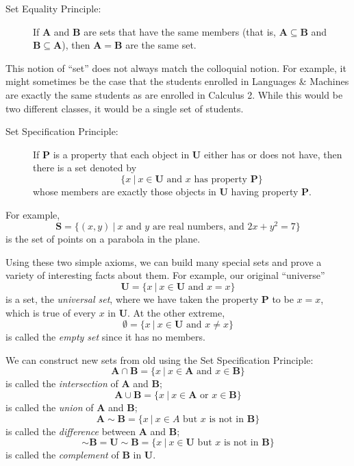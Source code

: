 \documentclass{article}
\newcommand{\Pb}{\mathbf P}
\newcommand{\Sb}{\mathbf S}
\newcommand{\A}{\mathbf A}
\newcommand{\B}{\mathbf B}
\newcommand{\U}{\mathbf U}
\begin{document}
\begin{description}
\item[Set Equality Principle:] If $\A$ and $\B$ are sets that have the same members (that is, $\A \subseteq \B$ and $\B \subseteq \A$), then $\A = \B$ are the same set.
\end{description}

This notion of ``set'' does not always match the colloquial notion. For example, it might sometimes be the case that the students enrolled in Languages \& Machines are exactly the same students as are enrolled in Calculus 2. While this would be two different classes, it would be a single set of students.

\begin{description}
\item[Set Specification Principle:] If $\Pb$ is a property that each object in $\U$ either has or does not have, then there is a set denoted by
  \begin{equation*}
  \{ x\ |\ x \in \U \text{ and } x \text{ has property } \Pb \}
  \end{equation*}
  whose members are exactly those objects in $\U$ having property $\Pb$.
\end{description}

For example,
\begin{equation*}
\Sb = \{ (x,y)\ |\ x \text{ and } y \text{ are real numbers, and } 2x + y^2 = 7 \}
\end{equation*}
is the set of points on a parabola in the plane.

Using these two simple axioms, we can build many special sets and prove a variety of interesting facts about them. For example, our original ``universe''
\begin{equation*}
\U = \{ x\ |\ x \in \U \text{ and } x = x \}
\end{equation*}
is a set, the \emph{universal set}, where we have taken the property $\Pb$ to be $x = x$, which is true of every $x$ in $\U$. At the other extreme,
\begin{equation*}
\emptyset = \{ x\ |\ x \in \U \text{ and } x \neq x \}
\end{equation*}
is called the \emph{empty set} since it has no members.

We can construct new sets from old using the Set Specification Principle:
\begin{equation*}
\A \cap \B = \{ x\ |\ x \in \A \text{ and } x \in \B \}
\end{equation*}
is called the \emph{intersection} of $\A$ and $\B$;
\begin{equation*}
\A \cup \B = \{ x\ |\ x \in \A \text{ or } x \in \B \}
\end{equation*}
is called the \emph{union} of $\A$ and $\B$;
\begin{equation*}
\A \sim \B = \{ x\ |\ x \in A \text{ but } x \text{ is not in } \B \}
\end{equation*}
is called the \emph{difference} between $\A$ and $\B$;
\begin{equation*}
\sim \B = \U \sim \B = \{ x\ |\ x \in \U \text{ but } x \text{ is not in } \B \}
\end{equation*}
is called the \emph{complement} of $\B$ in $\U$.
\end{document}
